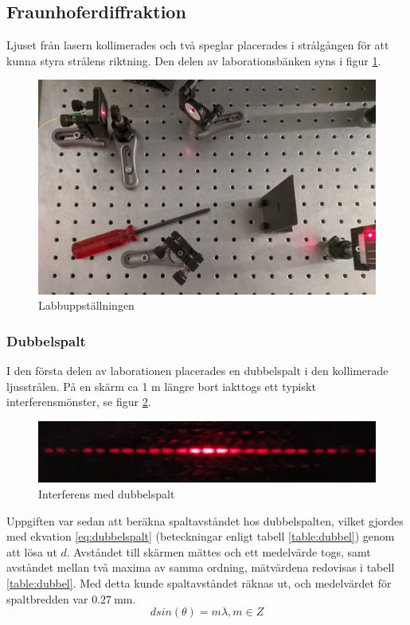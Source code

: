 \documentclass[a4paper]{article}
\begin{document}
\subsection{Fraunhoferdiffraktion}
Ljuset från lasern kollimerades och två speglar placerades i strålgången för att kunna styra strålens riktning. Den delen av laborationsbänken syns i figur \ref{fig:uppst}.
\begin{figure}[h!]
	\centering
	\includegraphics[width=\textwidth]{speglar.jpg}
	\caption{Labbuppställningen}
	\label{fig:uppst}
\end{figure}

\subsubsection{Dubbelspalt}
I den första delen av laborationen placerades en dubbelspalt i den kollimerade ljusstrålen. På en skärm ca 1 m längre bort iakttogs ett typiskt interferensmönster, se figur \ref{fig:dubbelspalt}.
\begin{figure}[h!]
\centering
\includegraphics[width=\textwidth]{2spalt.jpg}
\caption{Interferens med dubbelspalt}
\label{fig:dubbelspalt}
\end{figure}
Uppgiften var sedan att beräkna spaltavståndet hos dubbelspalten, vilket gjordes med ekvation \ref{eq:dubbelspalt} (beteckningar enligt tabell \ref{table:dubbel}) genom att lösa ut $d$. Avståndet till skärmen mättes och ett
medelvärde togs, samt avståndet mellan två maxima av samma ordning, mätvärdena redovisas i tabell \ref{table:dubbel}. Med detta kunde spaltavståndet räknas ut, och medelvärdet för spaltbredden
var $\SI{0.27}{\milli\meter}$.
\begin{equation}
	d sin(\theta) = m\lambda, m \in Z
	\label{eq:dubbelspalt}
\end{equation}
\end{document}
